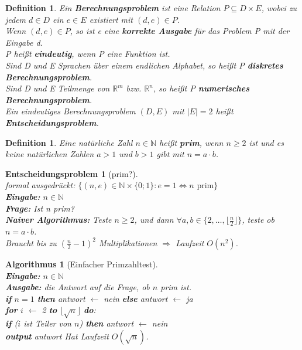 \documentclass[12pt,a4paper]{article}
\theoremstyle{plain}
\newtheorem{Definition}[Theorem]{Definition}
\newtheorem{Entscheidungsproblem}[Theorem]{Entscheidungsproblem}
\newtheorem{Algorithmus}[Theorem]{Algorithmus}
\newcommand{\herv}[1]{{\emph{\textbf{#1}}}}
\numberwithin{equation}{section}
\begin{document}
\begin{Definition}
Ein \herv{Berechnungsproblem} ist eine Relation $P\subseteq D\times E$, wobei zu jedem $d \in D$ ein $e \in E$ existiert mit $(d,e)\in P$. \\
Wenn $(d,e)\in P$, so ist e eine \herv{korrekte Ausgabe} für das Problem P mit der Eingabe d.\\
P heißt \herv{eindeutig}, wenn P eine Funktion ist.\\
Sind D und E Sprachen über einem endlichen Alphabet, so heißt P \herv{diskretes Berechnungsproblem}.\\
Sind D und E Teilmenge von $\mathbb{R}^m$ bzw. $\mathbb{R}^n$, so heißt P \herv{numerisches Berechnungsproblem}.\\
Ein eindeutiges Berechnungsproblem $(D,E)$ mit $|E|=2$ heißt \herv{Entscheidungsproblem}.
\end{Definition}
\begin{Definition}
Eine natürliche Zahl $n\in \mathbb{N}$ heißt \herv{prim}, wenn $n\geq 2$ ist und es keine natürlichen Zahlen $a>1$ und $b>1$ gibt mit $n=a\cdot b$.
\end{Definition}
\begin{Entscheidungsproblem}[\glqq prim?\grqq]\\
formal ausgedrückt: $\{(n,e)\in \mathbb{N}\times \{0;1\}:e=1 \Leftrightarrow n \text{ prim} \}$\\
\textbf{Eingabe:} $n\in \mathbb{N}$\\
\textbf{Frage:} Ist n prim? \\
\textbf{Naiver Algorithmus:} Teste $n\geq 2$, und dann $\forall a,b\in \{2,\ldots,\lfloor\frac{n}{2}\rfloor\}$, teste ob $n=a\cdot b$.\\
Braucht bis zu $\left(\frac{n}{2}-1 \right)^2$ Multiplikationen $\Rightarrow$ Laufzeit $O(n^2)$.
\end{Entscheidungsproblem}
\begin{Algorithmus}[Einfacher Primzahltest]\\
\textbf{Eingabe:} $n\in \mathbb{N}$\\
\textbf{Ausgabe:} die Antwort auf die Frage, ob $n$ prim ist. \\
\textbf{if} $n=1$ \textbf{then} antwort $\leftarrow$ nein \textbf{else} antwort $\leftarrow$ ja\\
\textbf{for} $i$ $\leftarrow$ 2 \textbf{to} $\lfloor \sqrt{n} \rfloor$ \textbf{do}: \\
\text{\qquad}\textbf{if} ($i$ ist Teiler von $n$) \textbf{then} antwort $\leftarrow$ nein \\
\textbf{output} antwort \newline
Hat Laufzeit $O(\sqrt{n})$.
\end{Algorithmus}
\end{document}
